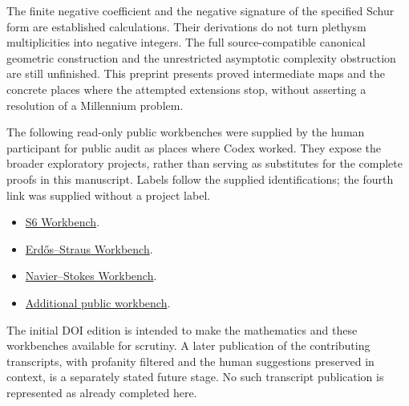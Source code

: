 The finite negative coefficient and the negative signature of the specified
Schur form are established calculations. Their derivations do not turn
plethysm multiplicities into negative integers. The full source-compatible
canonical geometric construction and the unrestricted asymptotic
complexity obstruction are still unfinished. This preprint presents
proved intermediate maps and the concrete places where the attempted
extensions stop, without asserting a resolution of a Millennium problem.

The following read-only public workbenches were supplied by the human
participant for public audit as places where Codex worked. They expose
the broader exploratory projects, rather than serving as substitutes
for the complete proofs in this manuscript. Labels follow the supplied
identifications; the fourth link was supplied without a project label.
\begin{itemize}
\item \href{https://www.overleaf.com/read/rtmyqxyrzprn\#fa24eb}{S6 Workbench}.
\item \href{https://www.overleaf.com/read/rnwvwkhfhztp\#8f63da}{Erd\H{o}s--Straus Workbench}.
\item \href{https://www.overleaf.com/read/hzthvczhdyxc\#a60fc2}{Navier--Stokes Workbench}.
\item \href{https://www.overleaf.com/read/sybvppjwxmxw\#b17484}{Additional public workbench}.
\end{itemize}
The initial DOI edition is intended to make the mathematics and these
workbenches available for scrutiny. A later publication of the contributing
transcripts, with profanity filtered and the human suggestions preserved
in context, is a separately stated future stage. No such transcript
publication is represented as already completed here.

